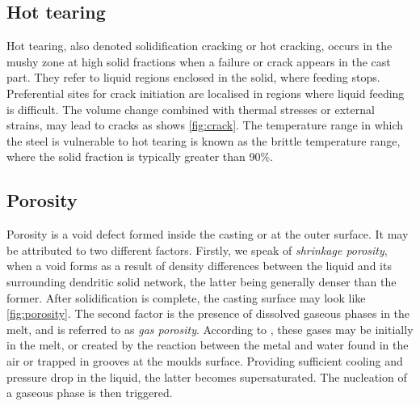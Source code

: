 
\subsection*{Hot tearing} 

Hot tearing, also denoted solidification cracking or hot cracking, occurs in the mushy zone 
at high solid fractions when a failure or crack appears in the cast part. 
They refer to liquid regions enclosed in the solid, where feeding stops. 
Preferential sites for crack initiation are localised in regions where liquid feeding is difficult.
The volume change combined with thermal stresses or external 
strains, may lead to cracks as shows \cref{fig:crack}. 
The temperature range in which the steel is vulnerable to hot tearing is known as the brittle 
temperature range, where the solid fraction is typically greater than \num{90}\%.

\subsection*{Porosity}
 
Porosity is a void defect formed inside the casting or at the outer surface. 
It may be attributed to two different factors.
Firstly, we speak of \emph{shrinkage porosity}, when a void forms as a result of density 
differences between the liquid and its surrounding dendritic solid network, the latter being generally denser 
than the former. After solidification is complete, the casting surface may look like \cref{fig:porosity}.
The second factor is the presence of dissolved gaseous phases in the melt, and is referred to as \emph{gas porosity}. 
According to \citet{dantzig_solidification_2009}, these gases may be initially in the melt, or created by the 
reaction between the metal and water found in the air or trapped in grooves at the moulds surface. Providing sufficient cooling
and pressure drop in the liquid, the latter becomes supersaturated. 
The nucleation of a gaseous phase is then triggered.

